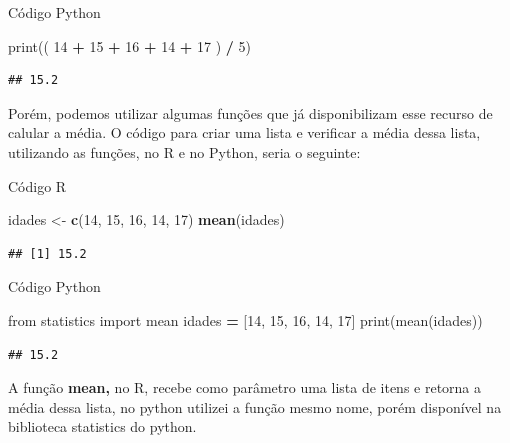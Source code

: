 \documentclass[
]{book}
\newenvironment{Shaded}{\begin{snugshade}}{\end{snugshade}}
\newcommand{\BuiltInTok}[1]{#1}
\newcommand{\DecValTok}[1]{\textcolor[rgb]{0.00,0.00,0.81}{#1}}
\newcommand{\FunctionTok}[1]{\textcolor[rgb]{0.13,0.29,0.53}{\textbf{#1}}}
\newcommand{\ImportTok}[1]{#1}
\newcommand{\NormalTok}[1]{#1}
\newcommand{\OperatorTok}[1]{\textcolor[rgb]{0.81,0.36,0.00}{\textbf{#1}}}
\newcommand{\OtherTok}[1]{\textcolor[rgb]{0.56,0.35,0.01}{#1}}
\begin{document}
Código Python

\begin{Shaded}
\begin{Highlighting}[]
\BuiltInTok{print}\NormalTok{(( }\DecValTok{14} \OperatorTok{+} \DecValTok{15} \OperatorTok{+} \DecValTok{16} \OperatorTok{+} \DecValTok{14} \OperatorTok{+} \DecValTok{17}\NormalTok{ ) }\OperatorTok{/} \DecValTok{5}\NormalTok{)}
\end{Highlighting}
\end{Shaded}

\begin{verbatim}
## 15.2
\end{verbatim}

Porém, podemos utilizar algumas funções que já disponibilizam esse recurso de calular a média. O código para criar uma lista e verificar a média dessa lista, utilizando as funções, no R e no Python, seria o seguinte:

Código R

\begin{Shaded}
\begin{Highlighting}[]
\NormalTok{idades }\OtherTok{\textless{}{-}} \FunctionTok{c}\NormalTok{(}\DecValTok{14}\NormalTok{, }\DecValTok{15}\NormalTok{, }\DecValTok{16}\NormalTok{, }\DecValTok{14}\NormalTok{, }\DecValTok{17}\NormalTok{)}
\FunctionTok{mean}\NormalTok{(idades)}
\end{Highlighting}
\end{Shaded}

\begin{verbatim}
## [1] 15.2
\end{verbatim}

Código Python

\begin{Shaded}
\begin{Highlighting}[]
\ImportTok{from}\NormalTok{ statistics }\ImportTok{import}\NormalTok{ mean }
\NormalTok{idades }\OperatorTok{=}\NormalTok{ [}\DecValTok{14}\NormalTok{, }\DecValTok{15}\NormalTok{, }\DecValTok{16}\NormalTok{, }\DecValTok{14}\NormalTok{, }\DecValTok{17}\NormalTok{]}
\BuiltInTok{print}\NormalTok{(mean(idades))}
\end{Highlighting}
\end{Shaded}

\begin{verbatim}
## 15.2
\end{verbatim}

A função \textbf{mean,} no R, recebe como parâmetro uma lista de itens e retorna a média dessa lista, no python utilizei a função mesmo nome, porém disponível na biblioteca statistics do python.
\end{document}
